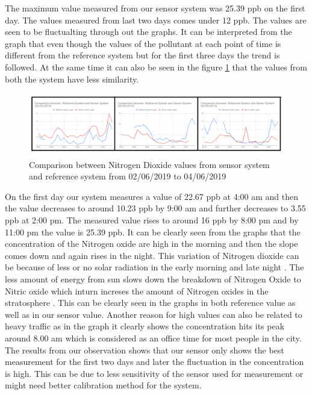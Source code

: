   \bigskip

The maximum value measured from our sensor system was 25.39 ppb on the first day. The values measured from last two days comes under 12 ppb. The values are seen to be fluctualting through out the graphs. It can be interpreted from the graph that even though the values of the pollutant at each point of time is different from the reference system but for the first three days the trend is followed. At the same time it can also be seen in the figure \ref{Nitrogen1} that the values from both the system have less similarity.

    \begin{figure}[h]
      \begin{center}
      \includegraphics[scale=0.70]{images/figure24.png}
      \end{center}
      \caption{Comparison between Nitrogen Dioxide values from sensor system and reference system from 02/06/2019 to 04/06/2019}
      \label{Nitrogen1}
    \end{figure}

    On the first day our system measures a value of 22.67 ppb at 4:00 am and then the value decreases to around 10.23 ppb by 9:00 am and further decreases to 3.55 ppb at 2:00 pm. The measured value rises to around 16 ppb by 8:00 pm and by 11:00 pm the value is 25.39 ppb. It can be clearly seen from the graphs that the concentration of the Nitrogen oxide are high in the morning and then the slope comes down and again rises in the night. This variation of Nitrogen dioxide can be because of less or no  solar radiation in the early morning and late night \cite{Environment2010} \cite{George2005}. The less amount of energy from sun slows down the breakdown of Nitrogen Oxide to Nitric oxide which inturn increses the amount of Nitrogen oxides in the stratosphere \cite{EnvironmentalQualitySectionMoE2012} \cite{Environment2010}. This can be clearly seen in the graphs in both reference value as well as in our sensor value. Another reason for high values can also be related to heavy traffic as in the graph it clearly shows the concentration hits its peak around 8.00 am which is considered as an office time for most people in the city. The results from our observation shows that our sensor only shows the best measurement for the first two days and later the fluctuation in the concentration is high. This can be due to less sensitivity of the sensor used for measurement or might need better calibration method for the system.



